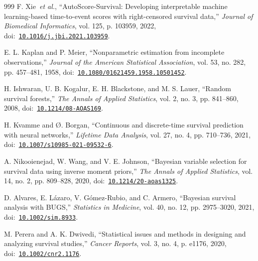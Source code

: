 \begin{thebibliography}{999}
\def\currentbiburl{https://doi.org/10.1016/j.jbi.2021.103959}
 F. Xie~\emph{et al.}, ``AutoScore-Survival: Developing interpretable machine learning-based time-to-event scores with right-censored survival data,'' \emph{Journal of Biomedical Informatics}, vol. 125, p. 103959, 2022, doi:~\href{https://doi.org/10.1016/j.jbi.2021.103959}{\nolinkurl{10.1016/j.jbi.2021.103959}}.

\def\currentbiburl{https://doi.org/10.1080/01621459.1958.10501452}
 E. L. Kaplan and P. Meier, ``Nonparametric estimation from incomplete observations,'' \emph{Journal of the American Statistical Association}, vol. 53, no. 282, pp. 457--481, 1958, doi:~\href{https://doi.org/10.1080/01621459.1958.10501452}{\nolinkurl{10.1080/01621459.1958.10501452}}.

\def\currentbiburl{https://doi.org/10.1214/08-AOAS169}
H. Ishwaran, U. B. Kogalur, E. H. Blackstone, and M. S. Lauer, ``Random survival forests,'' \emph{The Annals of Applied Statistics}, vol. 2, no. 3, pp. 841--860, 2008, doi:~\href{https://doi.org/10.1214/08-AOAS169}{\nolinkurl{10.1214/08-AOAS169}}.

\def\currentbiburl{https://doi.org/10.1007/s10985-021-09532-6}
 H. Kvamme and Ø. Borgan, ``Continuous and discrete-time survival prediction with neural networks,'' \emph{Lifetime Data Analysis}, vol. 27, no. 4, pp. 710--736, 2021, doi:~\href{https://doi.org/10.1007/s10985-021-09532-6}{\nolinkurl{10.1007/s10985-021-09532-6}}.

\def\currentbiburl{https://doi.org/10.1214/20-aoas1325}
 A. Nikooienejad, W. Wang, and V. E. Johnson, ``Bayesian variable selection for survival data using inverse moment priors,'' \emph{The Annals of Applied Statistics}, vol. 14, no. 2, pp. 809--828, 2020, doi:~\href{https://doi.org/10.1214/20-aoas1325}{\nolinkurl{10.1214/20-aoas1325}}.

\def\currentbiburl{https://doi.org/10.1002/sim.8933}
 D. Alvares, E. Lázaro, V. Gómez-Rubio, and C. Armero, ``Bayesian survival analysis with BUGS,'' \emph{Statistics in Medicine}, vol. 40, no. 12, pp. 2975--3020, 2021, doi:~\href{https://doi.org/10.1002/sim.8933}{\nolinkurl{10.1002/sim.8933}}.

\def\currentbiburl{https://doi.org/10.1002/cnr2.1176}
 M. Perera and A. K. Dwivedi, ``Statistical issues and methods in designing and analyzing survival studies,'' \emph{Cancer Reports}, vol. 3, no. 4, p. e1176, 2020, doi:~\href{https://doi.org/10.1002/cnr2.1176}{\nolinkurl{10.1002/cnr2.1176}}.


\end{thebibliography}
